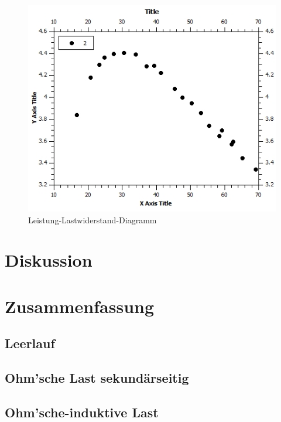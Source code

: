 \documentclass[12pt,a4paper,twoside]{article}
\begin{document}
\begin{figure}[H]
    \centering
    \includegraphics[width=0.6\linewidth, angle=0]{nudes/Leistung-Lastwiderstand-Diagramm.jpg}
    \caption{Leistung-Lastwiderstand-Diagramm}
    \label{fig:LeistungLastwiderstandDiagramm}
\end{figure}



\section{Diskussion} %




\section{Zusammenfassung} %

\subsection{Leerlauf}
\subsection{Ohm'sche Last sekundärseitig}
\subsection{Ohm'sche-induktive Last}



\printbibliography[heading=bibintoc]
\end{document}

